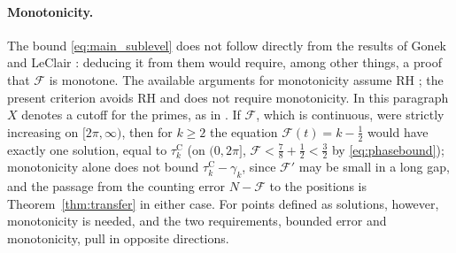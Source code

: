 \documentclass[11pt,a4paper]{article}
\makeatletter
\numberwithin{equation}{section}
\DeclareRobustCommand{\CGref}[1]{\ref{#1}}
\DeclareRobustCommand{\CGeqref}[1]{\eqref{#1}}
\DeclareRobustCommand{\CGcite}[2][]{\if\relax\detokenize{#1}\relax\cite{#2}\else\cite[#1]{#2}\fi}
\let\CG@origref\ref
\let\CG@origeqref\eqref
\newcommand{\CG@gettip}[1]{\@ifundefined{CGTip@#1}{#1}{\csname CGTip@#1\endcsname}}
\newcommand{\CG@getbib}[1]{\@ifundefined{CGBib@#1}{#1}{\csname CGBib@#1\endcsname}}
\DeclareRobustCommand{\CGref}[1]{\pdftooltip{\CG@origref{#1}}{\CG@gettip{#1}}}
\DeclareRobustCommand{\CGeqref}[1]{\pdftooltip{\CG@origeqref{#1}}{\CG@gettip{#1}}}
\DeclareRobustCommand{\CGcite}[2][]{\pdftooltip{\if\relax\detokenize{#1}\relax\cite{#2}\else\cite[#1]{#2}\fi}{\CG@getbib{#2}}}
\theoremstyle{definition}
\theoremstyle{remark}
\newcommand{\Fc}{\mathcal F}
\makeatother
\begin{document}
\paragraph{Monotonicity.}
The bound \CGeqref{eq:main_sublevel} does not follow directly from the results of Gonek \CGcite{Gonek2012} and LeClair \CGcite{LeClair2016}: deducing it from them would require, among other things, a proof that $\Fc$ is monotone. The available arguments for monotonicity assume RH \CGcite[Thm.~8.1 and \S10]{Gonek2012}; the present criterion avoids RH and does not require monotonicity. In this paragraph $X$ denotes a cutoff for the primes, as in \CGcite{Gonek2012}. If $\Fc$, which is continuous, were strictly increasing on $[2\pi,\infty)$, then for $k\ge2$ the equation $\Fc(t)=k-\frac12$ would have exactly one solution, equal to $\tau_{k}^{\mathrm C}$ (on $(0,2\pi]$, $\Fc<\frac78+\frac12<\frac32$ by \CGeqref{eq:phasebound}); monotonicity alone does not bound $\tau_{k}^{\mathrm C}-\gamma_k$, since $\Fc'$ may be small in a long gap, and the passage from the counting error $N-\Fc$ to the positions is Theorem~\CGref{thm:transfer} in either case. For points defined as solutions, however, monotonicity is needed, and the two requirements, bounded error and monotonicity, pull in opposite directions.
\end{document}
